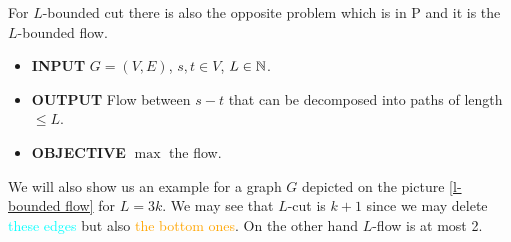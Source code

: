 For $L$-bounded cut there is also the opposite problem which is in P and it is the $L$-bounded flow.

\begin{itemize}[]
	\item \textbf{INPUT} $G = (V,E)$, $s,t \in V$, $L \in \mathbb{N}$.
	\item \textbf{OUTPUT} Flow between $s-t$ that can be decomposed into paths of length $\leq L$.
	\item \textbf{OBJECTIVE} $\max$ the flow.
\end{itemize}

We will also show us an example for a graph $G$ depicted on the picture \ref{l-bounded flow} for $L = 3k$. We may see that $L$-cut is $k+1$ since we may delete \textcolor{cyan}{these edges} but also \textcolor{orange}{the bottom ones}. On the other hand $L$-flow is at most 2.

